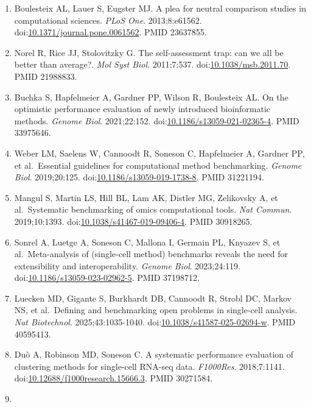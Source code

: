 \documentclass{article}
\begin{document}
\begin{enumerate}
\item
  Boulesteix AL, Lauer S, Eugster MJ. A plea for neutral comparison
  studies in computational sciences. \emph{PLoS One}. 2013;8:e61562.
  doi:\href{https://doi.org/10.1371/journal.pone.0061562}{10.1371/journal.pone.0061562}.
  PMID 23637855.
\item
  Norel R, Rice JJ, Stolovitzky G. The self-assessment trap: can we all
  be better than average?. \emph{Mol Syst Biol}. 2011;7:537.
  doi:\href{https://doi.org/10.1038/msb.2011.70}{10.1038/msb.2011.70}.
  PMID 21988833.
\item
  Buchka S, Hapfelmeier A, Gardner PP, Wilson R, Boulesteix AL. On the
  optimistic performance evaluation of newly introduced bioinformatic
  methods. \emph{Genome Biol}. 2021;22:152.
  doi:\href{https://doi.org/10.1186/s13059-021-02365-4}{10.1186/s13059-021-02365-4}.
  PMID 33975646.
\item
  Weber LM, Saelens W, Cannoodt R, Soneson C, Hapfelmeier A, Gardner PP,
  et al.~Essential guidelines for computational method benchmarking.
  \emph{Genome Biol}. 2019;20:125.
  doi:\href{https://doi.org/10.1186/s13059-019-1738-8}{10.1186/s13059-019-1738-8}.
  PMID 31221194.
\item
  Mangul S, Martin LS, Hill BL, Lam AK, Distler MG, Zelikovsky A, et
  al.~Systematic benchmarking of omics computational tools. \emph{Nat
  Commun}. 2019;10:1393.
  doi:\href{https://doi.org/10.1038/s41467-019-09406-4}{10.1038/s41467-019-09406-4}.
  PMID 30918265.
\item
  Sonrel A, Luetge A, Soneson C, Mallona I, Germain PL, Knyazev S, et
  al.~Meta-analysis of (single-cell method) benchmarks reveals the need
  for extensibility and interoperability. \emph{Genome Biol}.
  2023;24:119.
  doi:\href{https://doi.org/10.1186/s13059-023-02962-5}{10.1186/s13059-023-02962-5}.
  PMID 37198712.
\item
  Luecken MD, Gigante S, Burkhardt DB, Cannoodt R, Strobl DC, Markov NS,
  et al.~Defining and benchmarking open problems in single-cell
  analysis. \emph{Nat Biotechnol}. 2025;43:1035-1040.
  doi:\href{https://doi.org/10.1038/s41587-025-02694-w}{10.1038/s41587-025-02694-w}.
  PMID 40595413.
\item
  Duò A, Robinson MD, Soneson C. A systematic performance evaluation of
  clustering methods for single-cell RNA-seq data. \emph{F1000Res}.
  2018;7:1141.
  doi:\href{https://doi.org/10.12688/f1000research.15666.3}{10.12688/f1000research.15666.3}.
  PMID 30271584.
\item

\end{enumerate}
\end{document}
